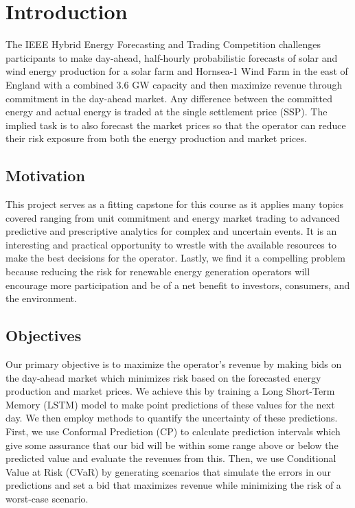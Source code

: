 \documentclass[
  journal,
]{IEEEtran}%
\begin{document}
\section{Introduction}\label{introduction}

The IEEE Hybrid Energy Forecasting and Trading Competition
 challenges participants to make
day-ahead, half-hourly probabilistic forecasts of solar and wind energy
production for a solar farm and Hornsea-1 Wind Farm in the east of
England with a combined 3.6 GW capacity and then maximize revenue
through commitment in the day-ahead market. Any difference between the
committed energy and actual energy is traded at the single settlement
price (SSP). The implied task is to also forecast the market prices so
that the operator can reduce their risk exposure from both the energy
production and market prices.

\subsection{Motivation}\label{motivation}

This project serves as a fitting capstone for this course as it applies
many topics covered ranging from unit commitment and energy market
trading to advanced predictive and prescriptive analytics for complex
and uncertain events. It is an interesting and practical opportunity to
wrestle with the available resources to make the best decisions for the
operator. Lastly, we find it a compelling problem because reducing the
risk for renewable energy generation operators will encourage more
participation and be of a net benefit to investors, consumers, and the
environment.

\subsection{Objectives}\label{objectives}

Our primary objective is to maximize the operator's revenue by making
bids on the day-ahead market which minimizes risk based on the
forecasted energy production and market prices. We achieve this by
training a Long Short-Term Memory (LSTM) model to make point predictions
of these values for the next day. We then employ methods to quantify the
uncertainty of these predictions. First, we use Conformal Prediction
(CP) to calculate prediction intervals which give some assurance that
our bid will be within some range above or below the predicted value and
evaluate the revenues from this. Then, we use Conditional Value at Risk
(CVaR) by generating scenarios that simulate the errors in our
predictions and set a bid that maximizes revenue while minimizing the
risk of a worst-case scenario.
\end{document}

